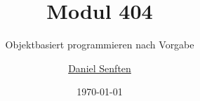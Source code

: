 \documentclass{manual}
\title{Modul 404}
\subtitle{Objektbasiert programmieren nach Vorgabe}
\date{\today}
\author{\href{mailto:daniel.senften@talent-factory.ch}{Daniel Senften}}
\begin{document}
    


\newpage\appendix
\listofexercises

\renewcommand{\listoflistingscaption}{Programmbeispiele}
\newpage\listoflistings
\end{document}
